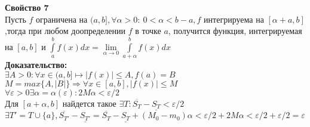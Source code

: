 \documentclass[a4paper,12pt]{article} %
\begin{document}
\begin{enumerate}
   \textbf{Свойство 7}\\[5mm] Пусть $f$ ограничена на $(a,b], \forall \alpha > 0: ~ 0<\alpha<b-a, f $ интегрируема на $[\alpha+a, b]$,тогда при любом доопределении $f$ в точке $a$, получится функция, интегрируемая на $[a,b]$ и $\int\limits_a^b f(x) dx = \lim \limits_{\alpha \rightarrow 0} \int\limits_{a+\alpha}^b f(x)dx$\\[2mm] 
   \textbf{Доказательство:}\\[2mm]
    $\exists A>0: \forall x \in (a,b] \longmapsto |f(x)|\leq A, f(a) = B$\\[2mm]
    $M = max\{A, |B|\} \Rightarrow \forall x \in [a,b], |f(x)|\leq M$\\[2mm]
    $\forall\varepsilon > 0 \exists \alpha = \alpha(\varepsilon):2M\alpha< \varepsilon/2$\\ [2mm]
    Для $[a+\alpha, b]$ найдется такое  $\exists T: \overline{S_T}- \underline{S_T}< \varepsilon/2$\\[2mm]
    $\exists T' = T \cup \{a\}, \overline{S_{T'}}- \underline{S_{T'}}= \overline{S_T}- \underline{S_T}+(M_0-m_0)\alpha<\varepsilon/2+2M\alpha<\varepsilon/2+\varepsilon/2=\varepsilon $\\[5mm]

\end{enumerate}
\end{document}
